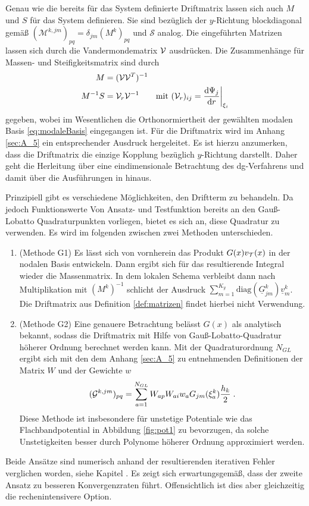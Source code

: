 Genau wie die bereits für das System definierte Driftmatrix lassen sich auch $M$ und $S$ für das System definieren. Sie sind bezüglich der $y$-Richtung blockdiagonal gemäß $(\mathcal{M}^{k,jm})_{pq} = \delta_{jm}(M^k)_{pq}$ und $\mathcal{S}$ analog.
Die eingeführten Matrizen lassen sich durch die Vandermondematrix $\mathcal{V}$ ausdrücken. Die Zusammenhänge für Massen- und Steifigkeitsmatrix sind durch
\begin{align*}
  M &= (\mathcal{V}\mathcal{V}^T)^{-1} \\
  M^{-1}S &= \mathcal{V}_r \mathcal{V}^{-1} \qquad \text{mit } (\mathcal{V}_r)_{ij} = \frac{\mathrm{d}\Psi_j}{\mathrm{d}r}\biggr\rvert_{\xi_i}
\end{align*}
gegeben, wobei im Wesentlichen die Orthonormiertheit der gewählten modalen Basis \eqref{eq:modaleBasis} eingegangen ist. Für die Driftmatrix wird im Anhang \ref{sec:A_5} ein entsprechender Ausdruck hergeleitet. Es ist hierzu anzumerken, dass die Driftmatrix die einzige Kopplung bezüglich $y$-Richtung darstellt. Daher geht die Herleitung über eine eindimensionale Betrachtung des \ac{dg}-Verfahrens und damit über die Ausführungen in \cite{buch} hinaus.

Prinzipiell gibt es verschiedene Möglichkeiten, den Driftterm zu behandeln. Da jedoch Funktionswerte Von Ansatz- und Testfunktion bereits an den Gauß-Lobatto Quadraturpunkten vorliegen, bietet es sich an, diese Quadratur zu verwenden. Es wird im folgenden zwischen zwei Methoden unterschieden.
\begin{enumerate}
  \item (Methode G1) Es lässt sich von vornherein das Produkt $G(x)v_{\mathcal{T}}(x)$ in der nodalen Basis entwickeln. Dann ergibt sich für das resultierende Integral wieder die Massenmatrix. In dem lokalen Schema verbleibt dann nach Multiplikation mit $(M^k)^{-1}$ schlicht der Ausdruck ${\sum_{m=1}^{K_y}\text{diag}(\underline{G}^k_{jm})\underline{v}_m^k}$. Die Driftmatrix aus Definition \ref{def:matrizen} findet hierbei nicht Verwendung.
  \item (Methode G2) Eine genauere Betrachtung belässt $G(x)$ als analytisch bekannt, sodass die Driftmatrix mit Hilfe von Gauß-Lobatto-Quadratur höherer Ordnung berechnet werden kann. Mit der Quadraturordnung $N_{GL}$ ergibt sich mit den dem Anhang \ref{sec:A_5} zu entnehmenden Definitionen der Matrix $W$ und der Gewichte $w$
  \begin{equation}
    (\mathcal{G}^{k,jm})_{pq} = \sum_{a=1}^{N_{GL}} W_{ap} W_{ai} w_a G_{jm}(\xi_a^k)\frac{h_k}{2} \; .
    \label{eq:G_GL}
  \end{equation}
  Diese Methode ist insbesondere für unstetige Potentiale wie das Flachbandpotential in Abbildung \ref{fig:pot1} zu bevorzugen, da solche Unstetigkeiten besser durch Polynome höherer Ordnung approximiert werden.
\end{enumerate}
Beide Ansätze sind numerisch anhand der resultierenden iterativen Fehler verglichen worden, siehe Kapitel . Es zeigt sich erwartungsgemäß, dass der zweite Ansatz zu besseren Konvergenzraten führt. Offensichtlich ist dies aber gleichzeitig die rechenintensivere Option.

